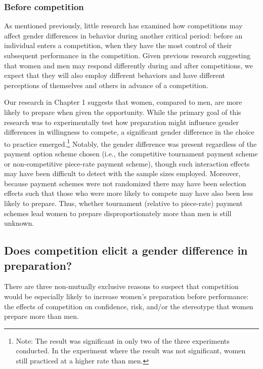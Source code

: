 \documentclass[letterpaper, nobind]{templates/ociamthesis}
\begin{document}
\hypertarget{before-competition}{%
\subsubsection{Before competition}\label{before-competition}}

As mentioned previously, little research has examined how competitions may affect gender differences in behavior during another critical period: before an individual enters a competition, when they have the most control of their subsequent performance in the competition. Given previous research suggesting that women and men may respond differently during and after competitions, we expect that they will also employ different behaviors and have different perceptions of themselves and others in advance of a competition.

Our research in Chapter 1 suggests that women, compared to men, are more likely to prepare when given the opportunity. While the primary goal of this research was to experimentally test how preparation might influence gender differences in willingness to compete, a significant gender difference in the choice to practice emerged.\footnote{Note: The result was significant in only two of the three experiments conducted. In the experiment where the result was not significant, women still practiced at a higher rate than men.} Notably, the gender difference was present regardless of the payment option scheme chosen (i.e., the competitive tournament payment scheme or non-competitive piece-rate payment scheme), though such interaction effects may have been difficult to detect with the sample sizes employed. Moreover, because payment schemes were not randomized there may have been selection effects such that those who were more likely to compete may have also been less likely to prepare. Thus, whether tournament (relative to piece-rate) payment schemes lead women to prepare disproportionately more than men is still unknown.

\hypertarget{does-competition-elicit-a-gender-difference-in-preparation}{%
\subsection{Does competition elicit a gender difference in preparation?}\label{does-competition-elicit-a-gender-difference-in-preparation}}

There are three non-mutually exclusive reasons to suspect that competition would be especially likely to increase women's preparation before performance: the effects of competition on confidence, risk, and/or the stereotype that women prepare more than men.
\end{document}
